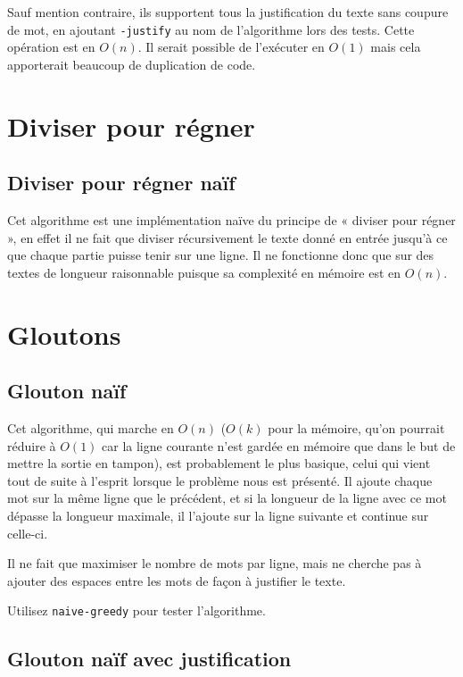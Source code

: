 \documentclass{article}
\begin{document}
Sauf mention contraire, ils supportent tous la justification du texte sans
coupure de mot, en ajoutant \verb|-justify| au nom de l'algorithme lors des
tests. Cette opération est en $O(n)$. Il serait possible de l'exécuter en $O(1)$
mais cela apporterait beaucoup de duplication de code.

\section{Diviser pour régner}

\subsection{Diviser pour régner naïf}

Cet algorithme est une implémentation naïve du principe de « diviser pour régner
», en effet il ne fait que diviser récursivement le texte donné en entrée
jusqu'à ce que chaque partie puisse tenir sur une ligne. Il ne fonctionne donc
que sur des textes de longueur raisonnable puisque sa complexité en mémoire est
en $O(n)$. %

\section{Gloutons}

\subsection{Glouton naïf}

Cet algorithme, qui marche en $O(n)$ ($O(k)$ pour la mémoire, qu'on pourrait
réduire à $O(1)$ car la ligne courante n'est gardée en mémoire que dans le but
de mettre la sortie en tampon), est probablement le plus basique, celui qui
vient tout de suite à l'esprit lorsque le problème nous est présenté. Il ajoute
chaque mot sur la même ligne que le précédent, et si la longueur de la ligne
avec ce mot dépasse la longueur maximale, il l'ajoute sur la ligne suivante et
continue sur celle-ci.

Il ne fait que maximiser le nombre de mots par ligne, mais ne cherche pas à
ajouter des espaces entre les mots de façon à justifier le texte.

Utilisez \verb|naive-greedy| pour tester l’algorithme.

\subsection{Glouton naïf avec justification}
\end{document}
